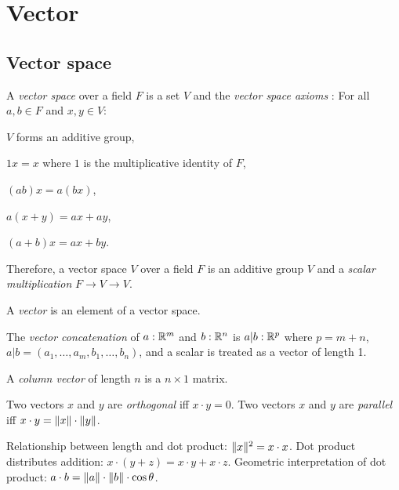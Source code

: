 \chapter{Vector}

\section{Vector space}

%
%
A \emph{vector space} over a field \(F\) is a set \(V\) and the
%
\emph{vector space axioms} \cite{wpvectorspace}\cite{roman2005advanced}:
For all \(a, b \in F\) and \(x, y \in V\):
\begin{enumerate*}[label={(\arabic*)}]
    \item \(V\) forms an additive group,
    \item \(1 x = x\) where \(1\) is the multiplicative identity of \(F\),
    \item \((ab)x = a(bx)\),
    \item \(a(x+y) = ax+ay\),
    \item \((a+b)x = ax+by\).
\end{enumerate*}
Therefore, a vector space \(V\) over a field \(F\) is
an additive group \(V\) and a \emph{scalar multiplication} \(F \to V \to V\).

%
A \emph{vector} is an element of a vector space.

%
%
%
The \emph{vector concatenation} of \(a : \mathbb{R}^m\) and \(b : \mathbb{R}^n\)
is \(a|b : \mathbb{R}^p\)
where \(p = m + n\),
\(a|b = (a_1 , \ldots , a_m , b_1 , \ldots , b_n)\),
and a scalar is treated as a vector of length 1.

%
%
A \emph{column vector} of length \(n\) is a \(n \times 1\) matrix.

%
%
Two vectors \(x\) and \(y\) are \emph{orthogonal} iff \(x \cdot y = 0\).
%
%
Two vectors \(x\) and \(y\) are \emph{parallel} iff \(x \cdot y = \lVert x\rVert \cdot \lVert y\rVert\).

%
%
Relationship between length and dot product: \(\lVert x\rVert^2 = x \cdot x\).
Dot product distributes addition: \(x \cdot (y+z) = x \cdot y + x \cdot z\).
Geometric interpretation of dot product: \(a \cdot b = \lVert a\rVert \cdot \lVert b\rVert \cdot \cos \theta\).

